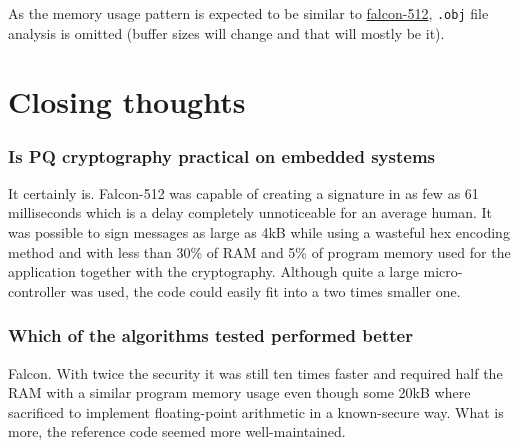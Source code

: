 \documentclass[
]{article}
\begin{document}
As the memory usage pattern is expected to be similar to
\href{falcon-512.md}{falcon-512}, \texttt{.obj} file analysis is omitted
(buffer sizes will change and that will mostly be it).

\hypertarget{end}{%
\part{Closing thoughts}
\label{end}}

\hypertarget{pq-on-embedded}{%
\section{Is PQ cryptography practical on embedded systems}\label{pq-on-embedded}}

It certainly is. Falcon-512 was capable of creating a signature in as few as 61 milliseconds which is a delay completely unnoticeable for an average human. It was possible to sign messages as large as 4kB while using a wasteful hex encoding method and with less than 30\% of RAM and 5\% of program memory used for the application together with the cryptography. Although quite a large micro-controller was used, the code could easily fit into a two times smaller one.

\hypertarget{winner}{%
\section{Which of the algorithms tested performed better}\label{winner}}

Falcon. With twice the security it was still ten times faster and required half the RAM with a similar program memory usage even though some 20kB where sacrificed to implement floating-point arithmetic in a known-secure way. What is more, the reference code seemed more well-maintained.
\end{document}
